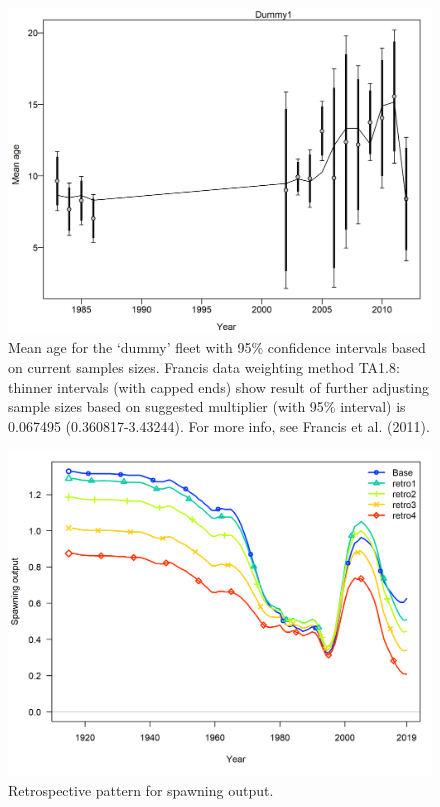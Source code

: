 \documentclass[12pt,]{article}
\begin{document}
\begin{figure}
\centering
\includegraphics{r4ss/plots_mod1/comp_condAALfit_data_weighting_TA1.8_condAgeDummy1.png}
\caption{Mean age for the `dummy' fleet with 95\% confidence intervals
based on current samples sizes. Francis data weighting method TA1.8:
thinner intervals (with capped ends) show result of further adjusting
sample sizes based on suggested multiplier (with 95\% interval) is
0.067495 (0.360817-3.43244). For more info, see Francis et al. (2011).
\label{fig:comp_condAALfit_data_weighting_TA1.8_condAgeDummy1}}
\end{figure}

\FloatBarrier

\FloatBarrier

\begin{figure}
\centering
\includegraphics{Figures/retro_spawnb.png}
\caption{Retrospective pattern for spawning output.
\label{fig:retro_spawnb}}
\end{figure}
\end{document}
